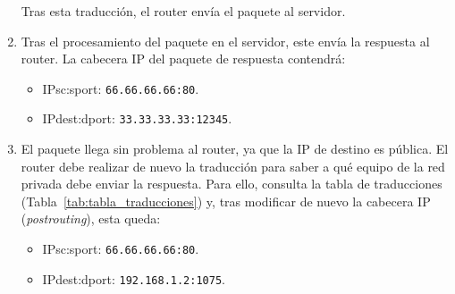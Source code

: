 \begin{ejemplo}
\begin{enumerate}[label=(\arabic*)]
        Tras esta traducción, el router envía el paquete al servidor.
        
        \item Tras el procesamiento del paquete en el servidor, este envía la respuesta al router. La cabecera IP del paquete de respuesta contendrá:
            \begin{itemize}
                \item {IPsc}:{sport}: \verb|66.66.66.66:80|.
                \item {IPdest}:{dport}: \verb|33.33.33.33:12345|.
            \end{itemize}
        
        \item El paquete llega sin problema al router, ya que la IP de destino es pública. El router debe realizar de nuevo la traducción para saber a qué equipo de la red privada debe enviar la respuesta. Para ello, consulta la tabla de traducciones (Tabla~\ref{tab:tabla_traducciones}) y, tras modificar de nuevo la cabecera IP (\textit{postrouting}), esta queda:
            \begin{itemize}
                \item {IPsc}:{sport}: \verb|66.66.66.66:80|.
                \item {IPdest}:{dport}: \verb|192.168.1.2:1075|.
            \end{itemize}
    \end{enumerate}
\end{ejemplo}


